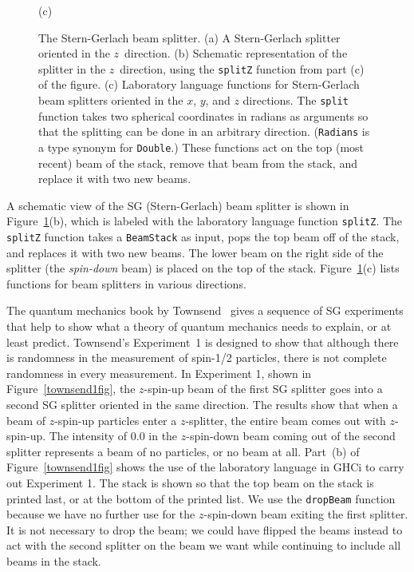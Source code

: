\documentclass[12pt]{article}
\newcommand{\DataTypeTok}[1]{\textcolor[rgb]{0.56,0.13,0.00}{{#1}}}
\newcommand{\FunctionTok}[1]{\textcolor[rgb]{0.02,0.16,0.49}{{#1}}}
\begin{document}
\begin{figure}
\begin{center}
(c)
  \end{center}
\caption{The Stern-Gerlach beam splitter.
  (a) A Stern-Gerlach splitter oriented in the $z$~direction.
  (b) Schematic representation of the splitter in the $z$~direction,
   using the \FunctionTok{\texttt{splitZ}} function from part (c)
   of the figure.
  (c) Laboratory language functions for Stern-Gerlach
  beam splitters oriented in the $x$, $y$, and $z$ directions.
  The \FunctionTok{\texttt{split}} function takes two spherical coordinates
  in radians as
  arguments so that the splitting can be done in an arbitrary direction.
  (\DataTypeTok{\texttt{Radians}} is a type synonym for \DataTypeTok{\texttt{Double}}.)
  These functions act on the top (most recent) beam of the stack, remove that
  beam from the stack, and replace it with two new beams.}
\label{sgsplitter}
\end{figure}

A schematic view of the SG (Stern-Gerlach) beam splitter is shown in
Figure~\ref{sgsplitter}(b), which is labeled with the laboratory language
function \FunctionTok{\texttt{splitZ}}.  The \FunctionTok{\texttt{splitZ}}
function takes a \DataTypeTok{\texttt{BeamStack}} as input, pops the top
beam off of the stack, and replaces it with two new beams.  The lower beam
on the right side of the splitter (the \emph{spin-down} beam)
is placed on the top of the stack.  Figure~\ref{sgsplitter}(c) lists
functions for beam splitters in various directions.

The quantum mechanics book by Townsend~\cite{townsend} gives a sequence
of SG experiments that help to show what a theory of quantum mechanics
needs to explain, or at least predict.  Townsend's Experiment~1
is designed to show that although there is randomness in the measurement
of spin-1/2 particles, there is not complete randomness in every measurement.
In Experiment 1, shown in Figure~\ref{townsend1fig},
the $z$-spin-up beam of the first SG splitter goes into a second SG splitter
oriented in the same direction.
The results show that when a beam of $z$-spin-up particles
enter a $z$-splitter, the entire beam comes out with $z$-spin-up.
The intensity of $0.0$ in the $z$-spin-down beam coming out of the second
splitter represents a beam of no particles, or no beam at all.
Part~(b) of Figure~\ref{townsend1fig} shows the use of the laboratory
language in GHCi to carry out Experiment 1.  The stack is shown so that
the top beam on the stack is printed last, or at the bottom of the printed
list.  We use the \FunctionTok{\texttt{dropBeam}} function
because we have no further use for the $z$-spin-down beam exiting
the first splitter.  It is not necessary to drop the beam; we could
have flipped the beams instead to act with the second splitter
on the beam we want while continuing to include all beams in the stack.
\end{document}
